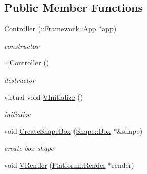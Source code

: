 \subsection*{Public Member Functions}
\begin{DoxyCompactItemize}
\item 
\hypertarget{classContent_1_1Actor_1_1Controller_a1a4b05c30e050180425f7d597ec6f3f8}{
\hyperlink{classContent_1_1Actor_1_1Controller_a1a4b05c30e050180425f7d597ec6f3f8}{Controller} (::\hyperlink{classFramework_1_1App}{Framework::App} $\ast$app)}
\label{classContent_1_1Actor_1_1Controller_a1a4b05c30e050180425f7d597ec6f3f8}

\begin{DoxyCompactList}\small\item\em constructor \item\end{DoxyCompactList}\item 
\hypertarget{classContent_1_1Actor_1_1Controller_afbc39ea16b5a9afc23028f728f5addb2}{
\hyperlink{classContent_1_1Actor_1_1Controller_afbc39ea16b5a9afc23028f728f5addb2}{$\sim$Controller} ()}
\label{classContent_1_1Actor_1_1Controller_afbc39ea16b5a9afc23028f728f5addb2}

\begin{DoxyCompactList}\small\item\em destructor \item\end{DoxyCompactList}\item 
\hypertarget{classContent_1_1Actor_1_1Controller_ae3be2fa04ccda4646b15f0c294572041}{
virtual void \hyperlink{classContent_1_1Actor_1_1Controller_ae3be2fa04ccda4646b15f0c294572041}{VInitialize} ()}
\label{classContent_1_1Actor_1_1Controller_ae3be2fa04ccda4646b15f0c294572041}

\begin{DoxyCompactList}\small\item\em initialize \item\end{DoxyCompactList}\item 
\hypertarget{classContent_1_1Actor_1_1Controller_a2ec0fca5a69e74223e9ed2e784335b67}{
void \hyperlink{classContent_1_1Actor_1_1Controller_a2ec0fca5a69e74223e9ed2e784335b67}{CreateShapeBox} (\hyperlink{classContent_1_1Shape_1_1Box}{Shape::Box} $\ast$\&shape)}
\label{classContent_1_1Actor_1_1Controller_a2ec0fca5a69e74223e9ed2e784335b67}

\begin{DoxyCompactList}\small\item\em create box shape \item\end{DoxyCompactList}\item 
\hypertarget{classContent_1_1Actor_1_1Controller_a2b16b053614b539bad5d180aa5d8a950}{
void \hyperlink{classContent_1_1Actor_1_1Controller_a2b16b053614b539bad5d180aa5d8a950}{VRender} (\hyperlink{classPlatform_1_1Render}{Platform::Render} $\ast$render)}
\label{classContent_1_1Actor_1_1Controller_a2b16b053614b539bad5d180aa5d8a950}


\end{DoxyCompactItemize}
